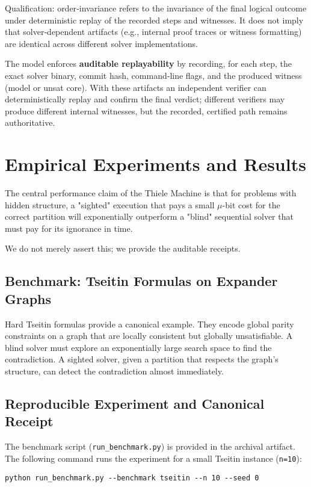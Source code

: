 \documentclass[11pt]{article}
\begin{document}
Qualification: order‑invariance refers to the invariance of the final logical outcome under deterministic replay of the recorded steps and witnesses. It does not imply that solver‑dependent artifacts (e.g., internal proof traces or witness formatting) are identical across different solver implementations.

The model enforces \textbf{auditable replayability} by recording, for each step, the exact solver binary, commit hash, command‑line flags, and the produced witness (model or unsat core). With these artifacts an independent verifier can deterministically replay and confirm the final verdict; different verifiers may produce different internal witnesses, but the recorded, certified path remains authoritative.

\section{Empirical Experiments and Results}
The central performance claim of the Thiele Machine is that for problems with hidden structure, a "sighted" execution that pays a small $\mu$-bit cost for the correct partition will exponentially outperform a "blind" sequential solver that must pay for its ignorance in time.

We do not merely assert this; we provide the auditable receipts.

\subsection{Benchmark: Tseitin Formulas on Expander Graphs}
Hard Tseitin formulas provide a canonical example. They encode global parity constraints on a graph that are locally consistent but globally unsatisfiable. A blind solver must explore an exponentially large search space to find the contradiction. A sighted solver, given a partition that respects the graph's structure, can detect the contradiction almost immediately.

\subsection{Reproducible Experiment and Canonical Receipt}
The benchmark script (\texttt{run\_benchmark.py}) is provided in the archival artifact. The following command runs the experiment for a small Tseitin instance (\texttt{n=10}):

\begin{verbatim}
python run_benchmark.py --benchmark tseitin --n 10 --seed 0
\end{verbatim}
\end{document}
